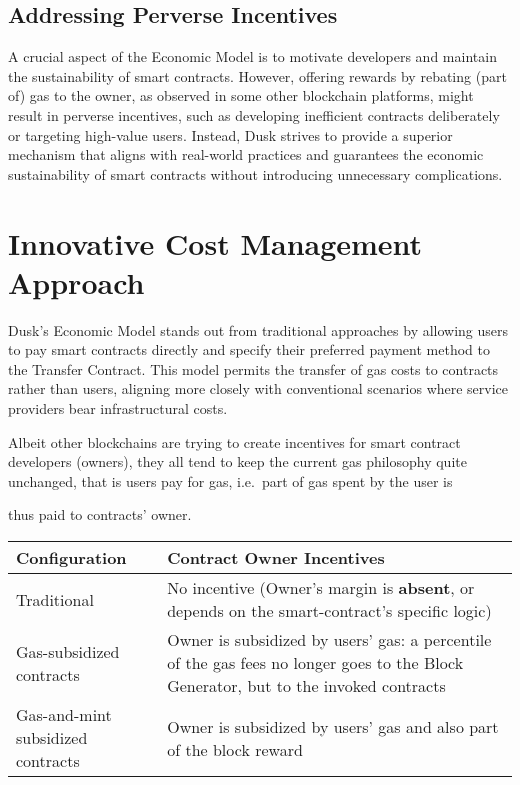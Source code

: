 \documentclass[twocolumn, nofootinbib]{revtex4-2}
\begin{document}
    \subsection{Addressing Perverse Incentives}\label{subsec:addressing-perverse-incentives}
    A crucial aspect of the Economic Model is to motivate developers and
    maintain the sustainability of smart contracts.
    However, offering rewards by rebating (part of) gas to the owner, as
    observed in some other blockchain platforms, might result in perverse
    incentives, such as developing inefficient contracts deliberately or
    targeting high-value users.
    Instead, Dusk strives to provide a superior mechanism that aligns with
    real-world practices and guarantees the economic sustainability of smart
    contracts without introducing unnecessary complications.

    \section{Innovative Cost Management Approach}\label{sec:innovative-cost-management-approach}
    Dusk's Economic Model stands out from traditional approaches by allowing
    users to pay smart contracts directly and specify their preferred payment
    method to the Transfer Contract.
    This model permits the transfer of gas costs to contracts rather than users,
    aligning more closely with conventional scenarios where service providers
    bear infrastructural costs.

    Albeit other blockchains are trying to create incentives for smart contract
    developers (owners), they all tend to keep the current gas philosophy quite
    unchanged, that is users pay for gas, i.e.\ part of gas spent by the user is

    thus paid to contracts' owner.

    \begin{tabular}{|m{0.3\linewidth}|m{0.7\linewidth}|}
        \hline
        Configuration & Contract Owner Incentives \\
        \hline
        \hline
        Traditional & No incentive (Owner's margin is \textbf{absent}, or
        depends on the smart-contract's specific logic) \\
        \hline
        Gas-subsidized contracts & Owner is subsidized by users' gas: a
        percentile of the gas fees no longer goes to the Block Generator, but
        to the invoked contracts \\
        \hline
        Gas-and-mint subsidized contracts & Owner is subsidized by users' gas
        and also part of the block reward \\
        \hline
    \end{tabular}
\end{document}

